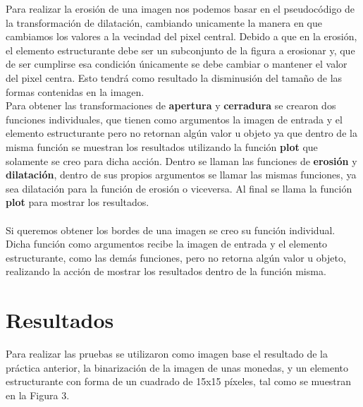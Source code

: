 \documentclass[conference]{IEEEtran}
\begin{document}

Para realizar la erosi\'on de una imagen nos podemos basar en el pseudoc\'odigo de la transformaci\'on de dilataci\'on, cambiando unicamente la manera en que cambiamos los valores a la vecindad del pixel central. Debido a que en la erosi\'on, el elemento estructurante debe ser un subconjunto de la figura a erosionar y, que de ser cumplirse esa condici\'on \'unicamente se debe cambiar o mantener el valor del pixel centra. Esto tendr\'a como resultado la disminusi\'on del tama\~no de las formas contenidas en la imagen.\\

Para obtener las transformaciones de \textbf{apertura} y \textbf{cerradura} se crearon dos funciones individuales, que tienen como argumentos la imagen de entrada y el elemento estructurante pero no retornan alg\'un valor u objeto ya que dentro de la misma funci\'on se muestran los resultados utilizando la funci\'on \textbf{plot} que solamente se creo para dicha acci\'on. Dentro se llaman las funciones de \textbf{erosi\'on} y \textbf{dilataci\'on}, dentro de sus propios argumentos se llamar las mismas funciones, ya sea dilataci\'on para la funci\'on de erosi\'on o viceversa. Al final se llama la funci\'on \textbf{plot} para mostrar los resultados.\\\\
Si queremos obtener los bordes de una imagen se creo su funci\'on individual. Dicha funci\'on como argumentos recibe la imagen de entrada y el elemento estructurante, como las dem\'as funciones, pero no retorna alg\'un valor u objeto, realizando la acci\'on de mostrar los resultados dentro de la funci\'on misma.

\section{Resultados}
Para realizar las pruebas se utilizaron como imagen base el resultado de la pr\'actica anterior, la binarizaci\'on de la imagen de unas monedas, y un elemento estructurante con forma de un cuadrado de 15x15 p\'ixeles, tal como se muestran en la Figura 3.
\end{document}
